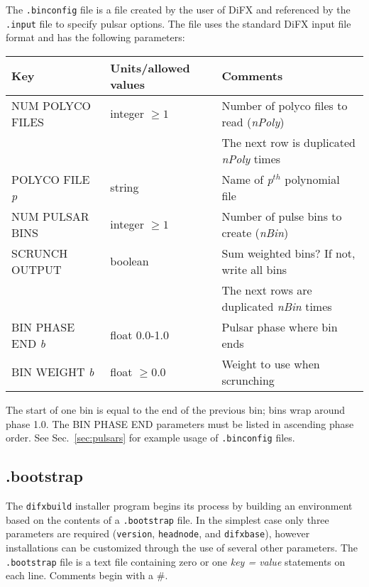 The {\tt .binconfig} file is a file created by the user of DiFX and referenced by the {\tt .input} file to specify pulsar options.
The file uses the standard DiFX input file format and has the following parameters:

\begin{center}
\begin{tabular}{l l l}
\hline
Key & Units/allowed values & Comments \\
\hline
NUM POLYCO FILES      & integer $\ge 1$ & Number of polyco files to read ({\em nPoly}) \\
                      &                 & The next row is duplicated {\em nPoly} times \\
POLYCO FILE {\em p}   & string          & Name of {\em p}$^{th}$ polynomial file \\
NUM PULSAR BINS       & integer $\ge 1$ & Number of pulse bins to create ({\em nBin}) \\
SCRUNCH OUTPUT        & boolean         & Sum weighted bins?  If not, write all bins \\
                      &                 & The next rows are duplicated {\em nBin} times \\
BIN PHASE END {\em b} & float 0.0-1.0   & Pulsar phase where bin ends \\
BIN WEIGHT {\em b}    & float $\ge 0.0$ & Weight to use when scrunching \\
\hline
\end{tabular}
\end{center}

The start of one bin is equal to the end of the previous bin; bins wrap around phase 1.0.
The BIN PHASE END parameters must be listed in ascending phase order.
See Sec.~\ref{sec:pulsars} for example usage of {\tt .binconfig} files.







\subsection{.bootstrap} \label{sec:bootstrapfile}

The {\tt difxbuild} installer program begins its process by building an environment based on the contents of a {\tt .bootstrap} file.
In the simplest case only three parameters are required ({\tt version}, {\tt headnode}, and {\tt difxbase}), however installations can be customized through the use of several other parameters.
The {\tt .bootstrap} file is a text file containing zero or one {\em key = value} statements on each line.
Comments begin with a \#.

